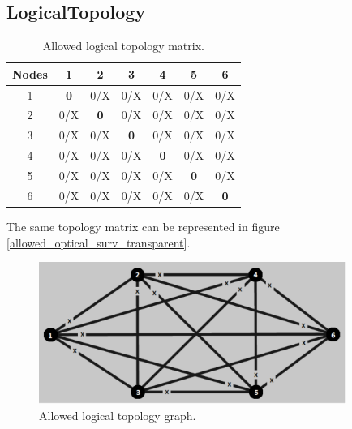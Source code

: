 \subsection{LogicalTopology}

\begin{table}[H]
	\centering	
	\begin{tabular}{|c|c|c|c|c|c|c|}
		\hline
		\multicolumn{1}{|l|}{\textbf{Nodes}} & 1   & 2   & 3   & 4   & 5   & 6   \\ \hline
		1                           & \textbf{0}   & 0/X & 0/X & 0/X & 0/X & 0/X \\ \hline
		2                           & 0/X & \textbf{0}   & 0/X & 0/X & 0/X & 0/X \\ \hline
		3                           & 0/X & 0/X & \textbf{0}   & 0/X & 0/X & 0/X \\ \hline
		4                           & 0/X & 0/X & 0/X & \textbf{0}   & 0/X & 0/X \\ \hline
		5                           & 0/X & 0/X & 0/X & 0/X & \textbf{0}   & 0/X \\ \hline
		6                           & 0/X & 0/X & 0/X & 0/X & 0/X & \textbf{0}   \\ \hline
	\end{tabular}
	\caption{Allowed logical topology matrix.}
	\label{logical_topology}
\end{table}

The same topology matrix can be represented in figure \ref{allowed_optical_surv_transparent}.
\begin{figure}[H]
	\centering
	\includegraphics[width=10cm]{sdf/heuristic/transparent/figures/allowed_optical}
	\caption{Allowed logical topology graph.}
	\label{allowed_optical_surv_transparent2}
\end{figure}

